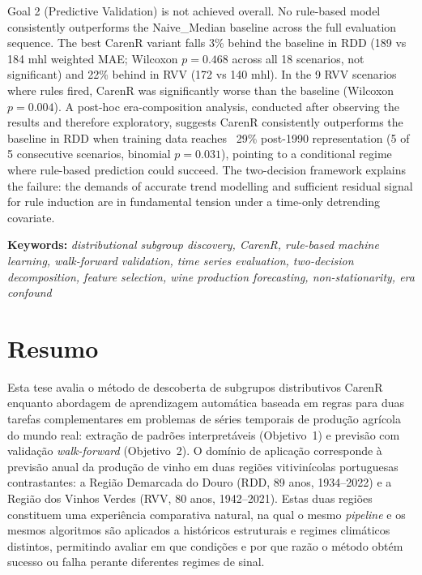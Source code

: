 Goal 2 (Predictive Validation) is not achieved overall. No rule-based model consistently outperforms the Naive\_Median baseline across the full evaluation sequence. The best CarenR variant falls 3\% behind the baseline in RDD (189 vs 184 mhl weighted MAE; Wilcoxon $p = 0.468$ across all 18 scenarios, not significant) and 22\% behind in RVV (172 vs 140 mhl). In the 9 RVV scenarios where rules fired, CarenR was significantly worse than the baseline (Wilcoxon $p = 0.004$). A post-hoc era-composition analysis, conducted after observing the results and therefore exploratory, suggests CarenR consistently outperforms the baseline in RDD when training data reaches ~29\% post-1990 representation (5 of 5 consecutive scenarios, binomial $p = 0.031$), pointing to a conditional regime where rule-based prediction could succeed. The two-decision framework explains the failure: the demands of accurate trend modelling and sufficient residual signal for rule induction are in fundamental tension under a time-only detrending covariate.

\textbf{Keywords: }\textit{distributional subgroup discovery, CarenR, rule-based machine learning, walk-forward validation, time series evaluation, two-decision decomposition, feature selection, wine production forecasting, non-stationarity, era confound}

\cleardoublepage

\chapter*{Resumo}

Esta tese avalia o método de descoberta de subgrupos distributivos CarenR enquanto abordagem de aprendizagem automática baseada em regras para duas tarefas complementares em problemas de séries temporais de produção agrícola do mundo real: extração de padrões interpretáveis (Objetivo~1) e previsão com validação \textit{walk-forward} (Objetivo~2). O domínio de aplicação corresponde à previsão anual da produção de vinho em duas regiões vitivinícolas portuguesas contrastantes: a Região Demarcada do Douro (RDD, 89 anos, 1934--2022) e a Região dos Vinhos Verdes (RVV, 80 anos, 1942--2021). Estas duas regiões constituem uma experiência comparativa natural, na qual o mesmo \textit{pipeline} e os mesmos algoritmos são aplicados a históricos estruturais e regimes climáticos distintos, permitindo avaliar em que condições e por que razão o método obtém sucesso ou falha perante diferentes regimes de sinal.

